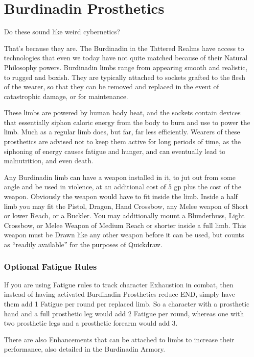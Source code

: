 \documentclass[oneside,11pt,english]{book}
\begin{document}
\section{Burdinadin Prosthetics}
Do these sound like weird cybernetics? 

That’s because they are. The Burdinadin in the Tattered Realms have access to
technologies that even we today have not quite matched because of their Natural
Philosophy powers. Burdinadin limbs range from appearing smooth and realistic,
to rugged and boxish. They are typically attached to sockets grafted to the
flesh of the wearer, so that they can be removed and replaced in the event of
catastrophic damage, or for maintenance.  

These limbs are powered by human body heat, and the sockets contain devices that
essentially siphon caloric energy from the body to burn and use to power the
limb. Much as a regular limb does, but far, far less efficiently. Wearers of
these prosthetics are advised not to keep them active for long periods of time,
as the siphoning of energy causes fatigue and hunger, and can eventually lead to
malnutrition, and even death.  

Any Burdinadin limb can have a weapon installed in it, to jut out from some angle and be used in 
violence, at an additional cost of 5 gp plus the cost of the weapon. Obviously the weapon would have to 
fit inside the limb. Inside a half limb you may fit the Pistol, Dragon, Hand Crossbow, any Melee weapon 
of Short or lower Reach, or a Buckler. You may additionally mount a Blunderbuss, Light Crossbow, or 
Melee Weapon of Medium Reach or shorter inside a full limb. This weapon must be Drawn like any other 
weapon before it can be used, but counts as “readily available” for the purposes of Quickdraw. 

\subsubsection{Optional Fatigue Rules}
If you are using Fatigue rules to track character Exhaustion in combat, then instead of having activated 
Burdinadin Prosthetics reduce END, simply have them add 1 Fatigue per round per replaced limb. So a 
character with a prosthetic hand and a full prosthetic leg would add 2 Fatigue per round, whereas one with 
two prosthetic legs and a prosthetic forearm would add 3. 

There are also Enhancements that can be attached to limbs to increase their performance, also detailed in 
the Burdinadin Armory. 
\end{document}
